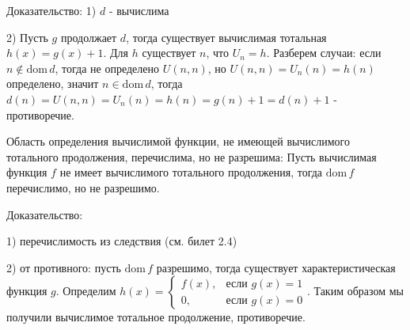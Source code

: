 \documentclass[a4paper, 10pt]{article}
\newcommand{\dom}{\text{dom}\,}
\begin{document}
Доказательство: 1) $d$ - вычислима

2) Пусть $g$ продолжает $d$, тогда существует вычислимая тотальная $h(x)=g(x)+1$. Для $h$ существует $n$, что $U_n=h$. Разберем случаи: если $n\not\in\dom d$, тогда не определено $U(n,n)$, но $U(n,n)=U_n(n)=h(n)$ определено, значит $n\in\dom d$, тогда $d(n)=U(n,n)=U_n(n)=h(n)=g(n)+1=d(n)+1$ - противоречие.

\hfill

Область определения вычислимой функции, не имеющей вычислимого тотального продолжения, перечислима, но не разрешима: Пусть вычислимая функция $f$ не имеет вычислимого тотального продолжения, тогда $\dom f$ перечислимо, но не разрешимо.

Доказательство:

1) перечислимость из следствия (см. билет 2.4)

2) от противного: пусть $\dom f$ разрешимо, тогда существует характеристическая функция $g$. Определим $h(x)=\begin{cases}
    f(x),&\text{если }g(x)=1 \\ 0,&\text{если }g(x)=0
\end{cases}$. Таким образом мы получили вычислимое тотальное продолжение, противоречие.
\end{document}
